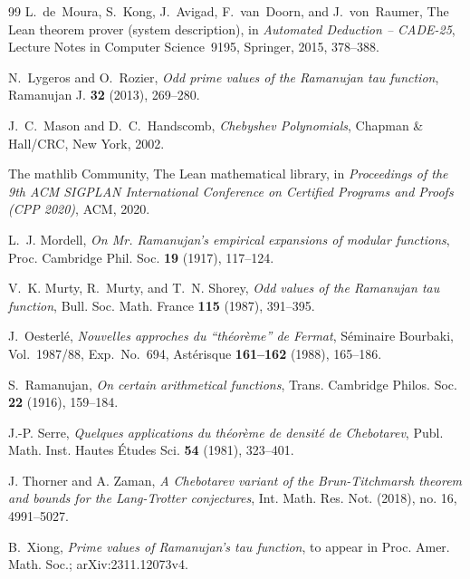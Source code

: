 \documentclass[12pt]{amsart}
\theoremstyle{remark}
\numberwithin{equation}{section}
\begin{document}
\begin{thebibliography}{99}
L.~de~Moura, S.~Kong, J.~Avigad, F.~van~Doorn, and J.~von~Raumer,
The {L}ean theorem prover (system description),
in \emph{Automated Deduction -- CADE-25},
Lecture Notes in Computer Science~9195, Springer, 2015, 378--388.


N.~Lygeros and O.~Rozier,
\emph{Odd prime values of the Ramanujan tau function},
Ramanujan J. \textbf{32} (2013), 269--280.

J.~C.~Mason and D.~C.~Handscomb,
\emph{Chebyshev Polynomials},
Chapman \& Hall/CRC, New York, 2002.


The mathlib Community,
The {L}ean mathematical library,
in \emph{Proceedings of the 9th ACM SIGPLAN International Conference on
Certified Programs and Proofs (CPP 2020)},
ACM, 2020.

L.~J. Mordell,
\emph{On Mr. Ramanujan's empirical expansions of modular functions},
Proc. Cambridge Phil. Soc. \textbf{19} (1917), 117--124.

V.~K. Murty, R.~Murty, and T.~N. Shorey,
\emph{Odd values of the Ramanujan tau function},
Bull. Soc. Math. France \textbf{115} (1987), 391--395.

J.~Oesterl\'e,
\emph{Nouvelles approches du ``th\'eor\`eme'' de Fermat},
S\'eminaire Bourbaki, Vol.~1987/88, Exp.~No.~694,
Ast\'erisque \textbf{161--162} (1988), 165--186.

S.~Ramanujan,
\emph{On certain arithmetical functions},
Trans. Cambridge Philos. Soc. \textbf{22} (1916), 159--184.

J.-P. Serre,
\emph{Quelques applications du th\'eor\`eme de densit\'e de Chebotarev},
Publ. Math. Inst. Hautes \'Etudes Sci. \textbf{54} (1981), 323--401.

J. Thorner and A. Zaman, \emph{A Chebotarev variant of the Brun-Titchmarsh
theorem and bounds for the Lang-Trotter conjectures}, Int. Math. Res. Not. (2018), no. 16, 4991--5027.

B.~Xiong,
\emph{Prime values of Ramanujan's tau function},
to appear in Proc. Amer. Math. Soc.; arXiv:2311.12073v4.

\end{thebibliography}
\end{document}
